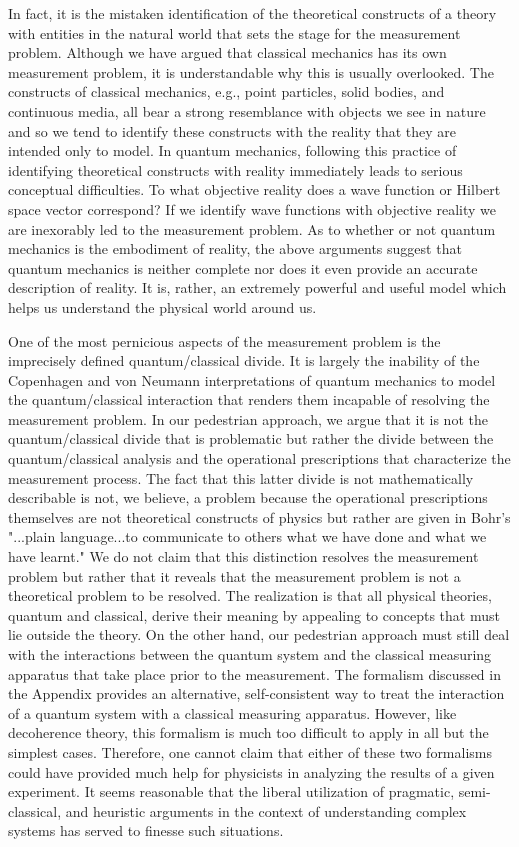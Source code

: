 \documentclass [12pt]{revtex4}
\begin{document}
In fact, it is the mistaken identification of the theoretical constructs of a theory with entities in the natural world that sets the stage for the measurement problem.  Although we have argued that classical mechanics has its own measurement problem, it is understandable why this is usually overlooked.  The constructs of classical mechanics, e.g., point particles, solid bodies, and continuous media, all bear a strong resemblance with objects we see in nature and so we tend to identify these constructs with the reality that they are intended only to model.  In quantum mechanics, following this practice of identifying theoretical constructs with reality immediately leads to serious conceptual difficulties.  To what objective reality does a wave function or Hilbert space vector correspond?  If we identify wave functions with objective reality we are inexorably led to the measurement problem.  As to whether or not quantum mechanics is the embodiment of reality, the above arguments suggest that quantum mechanics is neither complete nor does it even provide an accurate description of reality. It is, rather, an extremely powerful and useful model which helps us understand the physical world around us. 

One of the most pernicious aspects of the measurement problem is
the imprecisely defined quantum/classical divide.  It is largely the
inability of the Copenhagen and von Neumann interpretations of quantum
mechanics to model the quantum/classical interaction that renders them
incapable of resolving the measurement problem.  In our pedestrian
approach, we argue that it is not the quantum/classical divide that
is problematic but rather the divide between the quantum/classical
analysis and the operational prescriptions that characterize the
measurement process.  The fact that this latter divide is not
mathematically describable is not, we believe, a problem because
the operational prescriptions themselves are not theoretical constructs
of physics but rather are given in Bohr's "...plain language...to
communicate to others what we have done and what we have learnt."
We do not claim that this distinction resolves the measurement problem
but rather that it reveals that the measurement problem is not a theoretical
problem to be resolved.  The realization is that all physical theories,
quantum and classical, derive their meaning by appealing to concepts that
must lie outside the theory.  On the other hand, our pedestrian
approach must still deal with the interactions between the quantum system and
the classical measuring apparatus that take place prior to the measurement.
The formalism discussed in the Appendix provides an alternative, self-consistent 
way to treat the interaction of a quantum system with a
classical measuring apparatus.  However, like decoherence theory, this
formalism is much too difficult to apply in all but the simplest
cases.  Therefore, one cannot claim that either of these two formalisms
could have provided much help for physicists in analyzing the results
of a given experiment. It seems reasonable that the liberal utilization of
pragmatic, semi-classical, and heuristic arguments in the context of understanding
complex systems has served to finesse such situations.
\end{document}
